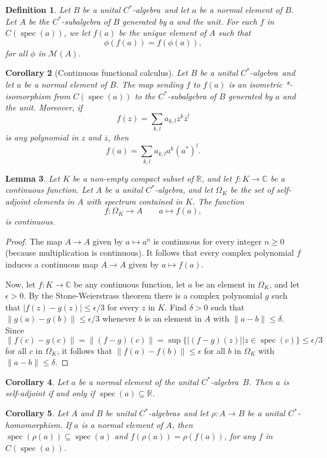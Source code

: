 \documentclass{book}
\newtheorem{definition}{Definition}[section]
\newtheorem{lemma}[definition]{Lemma}
\newtheorem{corollary}[definition]{Corollary}
\def\cstar{\(C^*\)-algebra}
\def\cstars{\(C^*\)-algebras}
\begin{document}
\begin{definition}\label{Petersen:118}
  Let \(B\) be a unital \cstar\ and let \(a\) be a normal element
  of \(B\). Let \(A\) be the \(C^*\)-subalgebra of \(B\) generated by \(a\) and the unit. For each
  \(f\) in \(C(\operatorname{spec}(a))\), we let \(f(a)\) be the unique element of \(A\) such that
  \[
    \phi(f(a)) = f(\phi(a)),
  \]
  for all \(\phi\) in \(\mathcal{M}(A)\).
\end{definition}
\begin{corollary}[Continuous functional calculus]\label{corollary:149}
  Let \(B\) be a unital \cstar\ and let \(a\) be a normal element of \(B\). The map sending \(f\) to \(f(a)\) is an isometric *-isomorphism from
  \(C(\operatorname{spec}(a))\) to the \(C^*\)-subalgebra of \(B\) generated by \(a\) and the unit. Moreover, if 
  \[
    f(z) = \sum_{k,l} a_{k,l}z^k\overline{z}^l
  \]
  is any polynomial in \(z\) and \(\overline{z}\), then
  \[
   f(a) =\sum_{k,l}a_{k,l}a^k{(a^*)}^l.
  \]
\end{corollary}
\begin{lemma}\label{lemma:125}
  Let \(K\) be a non-empty compact subset of \(\mathbb{R}\), and let \(f:K\rightarrow\mathbb{C}\) be a continuous function.
  Let \(A\) be a unital \cstar, and let \(\Omega_K\) be the set of self-adjoint elements in \(A\) with spectrum contained in \(K\).
  The function
  \[f:\Omega_K\rightarrow A\qquad a\mapsto f(a),\]
  is continuous.
\end{lemma}
\begin{proof}
  The map \(A \rightarrow A\) given by \(a\mapsto a^n\) is continuous for every integer \(n\geq 0\) (because multiplication is continuous).
  It follows that every complex polynomial \(f\) induces a continuous map \(A\rightarrow A\) given by \(a\mapsto f(a)\).\par
  Now, let \(f:K\rightarrow\mathbb{C}\) be any continuous function, let \(a\) be an element in \(\Omega_K\), and let \(\epsilon>0\).
  By the Stone-Weierstrass theorem there is a complex polynomial \(g\) such that \(|f(z)-g(z)|\leq\epsilon/3\) for every \(z\) in \(K\).
  Find \(\delta>0\) such that \(\|g(a)-g(b)\|\leq\epsilon/3\) whenever \(b\) is an element in \(A\) with \(\|a-b\|\leq\delta\). Since
  \[
    \|f(c)-g(c)\|=\|(f-g)(c)\|=\sup\{|(f-g)(z)| | z\in \operatorname{spec}(c)\}\leq\epsilon/3
  \]
  for all \(c\) in \(\Omega_K\), it follows that \(\|f(a)-f(b)\|\leq\epsilon\) for all \(b\) in \(\Omega_K\) with \(\|a-b\|\leq\delta\).
\end{proof}
\begin{corollary}\label{corollary:1410}
  Let \(a\) be a normal element of the unital \cstar\ \(B\).
  Then \(a\) is self-adjoint if and only if \(\operatorname{spec}(a) \subseteq\mathbb{R}\).
\end{corollary}
\begin{corollary}
  Let \(A\) and \(B\) be unital \cstars\ and let \(\rho:A\rightarrow B\) be a
  unital \(C^*\)-homomorphism. If \(a\) is a normal element of \(A\), then \(\operatorname{spec}(\rho(a)) \subseteq
  \operatorname{spec}(a)\) and \(f(\rho(a)) = \rho(f(a))\), for any \(f\) in \(C(\operatorname{spec}(a))\).
\end{corollary}
\end{document}
